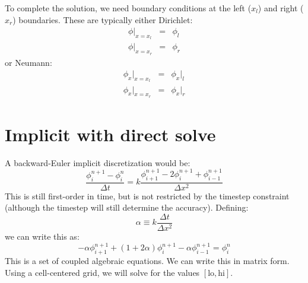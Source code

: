 To complete the solution, we need boundary conditions at the left
($x_l$) and right ($x_r$) boundaries.  These are typically either
Dirichlet:
\begin{eqnarray}
\phi |_{x=x_l} &=& \phi_l\\
\phi |_{x=x_r} &=& \phi_r
\end{eqnarray}
or Neumann:
\begin{eqnarray}
\phi_x |_{x=x_l} &=& \phi_x |_l\\
\phi_x |_{x=x_r} &=& \phi_x |_r
\end{eqnarray}

\section{Implicit with direct solve}

A backward-Euler implicit discretization would be:
\begin{equation}
\frac{\phi_i^{n+1} - \phi_i^n}{\Delta t} = 
  k \frac{\phi_{i+1}^{n+1} - 2\phi_i^{n+1} + \phi_{i-1}^{n+1}}{\Delta x^2}
\end{equation}
This is still first-order in time, but is not restricted by the timestep
constraint (although the timestep will still determine the accuracy).  
Defining:
\begin{equation}
\alpha \equiv k \frac{\Delta t}{\Delta x^2}
\end{equation}
we can write this as:
\begin{equation}
\label{eq:diff:implicit}
-\alpha \phi_{i+1}^{n+1} + (1 + 2\alpha) \phi_{i}^{n+1} - \alpha \phi_{i-1}^{n+1} = \phi_i^n
\end{equation}
This is a set of coupled algebraic equations.  We can write this in
matrix form.  Using a cell-centered grid, we will solve for the values
$[\mathrm{lo},\mathrm{hi}]$.  

